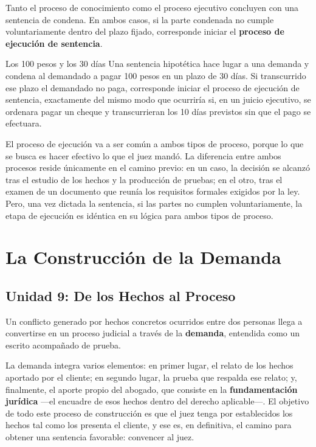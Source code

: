 \documentclass[12pt,oneside]{book}
\begin{document}
Tanto el proceso de conocimiento como el proceso ejecutivo concluyen con una sentencia de condena. En ambos casos, si la parte condenada no cumple voluntariamente dentro del plazo fijado, corresponde iniciar el \textbf{proceso de ejecución de sentencia}.

\begin{example}{Los 100 pesos y los 30 días}
Una sentencia hipotética hace lugar a una demanda y condena al demandado a pagar 100 pesos en un plazo de 30 días. Si transcurrido ese plazo el demandado no paga, corresponde iniciar el proceso de ejecución de sentencia, exactamente del mismo modo que ocurriría si, en un juicio ejecutivo, se ordenara pagar un cheque y transcurrieran los 10 días previstos sin que el pago se efectuara.
\end{example}

El proceso de ejecución va a ser común a ambos tipos de proceso, porque lo que se busca es hacer efectivo lo que el juez mandó. La diferencia entre ambos procesos reside únicamente en el camino previo: en un caso, la decisión se alcanzó tras el estudio de los hechos y la producción de pruebas; en el otro, tras el examen de un documento que reunía los requisitos formales exigidos por la ley. Pero, una vez dictada la sentencia, si las partes no cumplen voluntariamente, la etapa de ejecución es idéntica en su lógica para ambos tipos de proceso.


\chapter{La Construcción de la Demanda}

\section{Unidad 9: De los Hechos al Proceso}

Un conflicto generado por hechos concretos ocurridos entre dos personas llega a convertirse en un proceso judicial a través de la \textbf{demanda}, entendida como un escrito acompañado de prueba.

La demanda integra varios elementos: en primer lugar, el relato de los hechos aportado por el cliente; en segundo lugar, la prueba que respalda ese relato; y, finalmente, el aporte propio del abogado, que consiste en la \textbf{fundamentación jurídica} ---el encuadre de esos hechos dentro del derecho aplicable---. El objetivo de todo este proceso de construcción es que el juez tenga por establecidos los hechos tal como los presenta el cliente, y ese es, en definitiva, el camino para obtener una sentencia favorable: convencer al juez.
\end{document}
